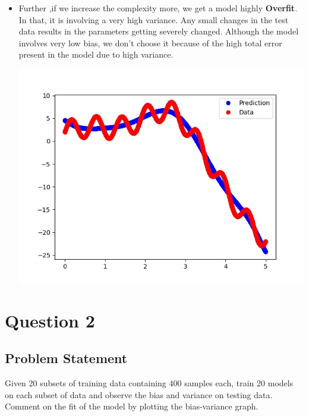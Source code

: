 \documentclass[11pt]{article}
\begin{document}
\begin{itemize}
\begin{center}
	\end{center}
		\item Further ,if we increase the complexity more, we get a model highly \textbf{Overfit}. In that, it is involving a very high variance. Any small changes in the test data results in the parameters getting severely changed. Although the model involves very low bias, we don't choose it because of the high total error present in the model due to high variance.
				\begin{center}
		\hspace{-1.5cm}	\includegraphics[scale=0.8]{../q1fig9.jpg}
		\end{center}
	\end{itemize}

	\section{Question 2}
	\subsection{Problem Statement}
	Given 20 subsets of training data containing 400 samples each, train 20 models
	on each subset of data and observe the bias and variance on testing data.
	Comment on the fit of the model by plotting the bias-variance graph. 
\end{document}
